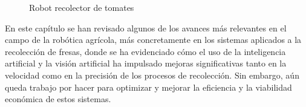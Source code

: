 
\begin{figure}[H]
    \begin{center}
      \subcapcentertrue
      \hspace{2mm}
    \end{center}
    \caption{Robot recolector de tomates}
    \label{fig:Robots_tomates}
\end{figure}

\vspace{1,25cm}

En este capítulo se han revisado algunos de los avances más relevantes en el campo de la robótica agrícola, más concretamente en los sistemas aplicados a la recolección de fresas, donde se ha evidenciado cómo el uso de la inteligencia artificial y la visión artificial ha impulsado mejoras significativas tanto en la velocidad como en la precisión de los procesos de recolección. Sin embargo, aún queda trabajo por hacer para optimizar y mejorar la eficiencia y la viabilidad económica de estos sistemas.\\

